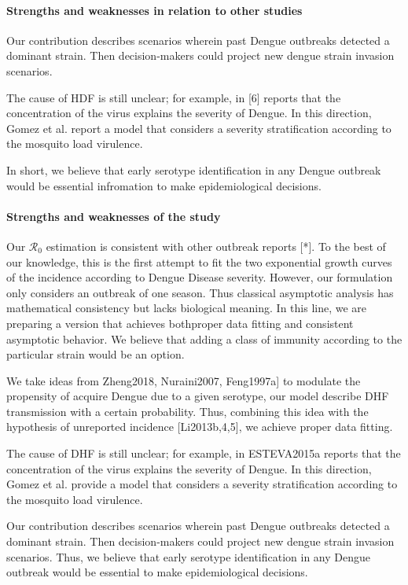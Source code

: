     \paragraph{Strengths and weaknesses in relation 
        to other studies}
        
        Our contribution describes scenarios wherein past Dengue outbreaks
    detected a dominant strain. Then decision-makers could project new
    dengue strain invasion scenarios.

        The cause of HDF is still unclear; for example, in [6] reports that
    the concentration of the virus explains the severity of Dengue. In
    this direction, Gomez et al. report a model that considers a severity
    stratification according to the mosquito load virulence.

        In short, we believe that early serotype identification in any Dengue
    outbreak would be essential infromation to make epidemiological decisions.
    \paragraph{Strengths and weaknesses of the study} 
        Our $\mathcal{R}_0$ estimation is consistent with other outbreak reports [*].
    To the best of our knowledge, this is the first attempt to fit the 
    two exponential growth curves of the incidence according to Dengue 
    Disease severity. However, our formulation only considers an outbreak
    of one season. Thus classical asymptotic analysis has mathematical 
    consistency but lacks biological meaning.  In this line, we are preparing
    a version that achieves both\textemdash proper data fitting and consistent
    asymptotic behavior. We believe that adding a class of immunity according
    to the particular strain would be an option.

         We take ideas from Zheng2018, Nuraini2007, Feng1997a] to modulate 
    the propensity of acquire Dengue due to a given serotype, 
    our model describe DHF transmission with a certain probability.  
    Thus, combining this idea with the hypothesis of unreported 
    incidence [Li2013b,4,5], we achieve proper
    data fitting. 

        The cause of DHF is still unclear; for example, in ESTEVA2015a reports
    that the concentration of the virus explains the severity of Dengue.
    In this direction, Gomez et al. provide a model that considers a
    severity stratification according to the mosquito load virulence.

        Our contribution describes scenarios wherein past Dengue
    outbreaks detected a dominant  strain. Then decision-makers could
    project new dengue strain invasion scenarios. Thus, we believe that early 
    serotype identification in any Dengue outbreak would be essential to  
    make epidemiological decisions.
